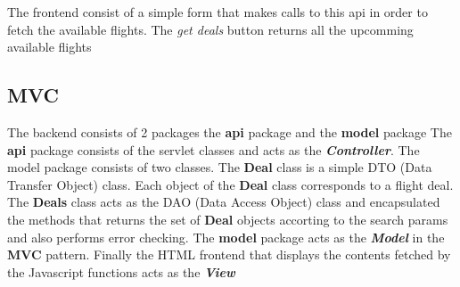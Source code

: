 \documentclass[titlepage]{article}
\begin{document}
    The frontend consist of a simple form that makes calls to this api in order to fetch the
    available flights. The \emph{get deals} button returns all the upcomming available flights

    \subsection{MVC}
    The backend consists of 2 packages the \textbf{api} package and the \textbf{model} package
    The \textbf{api} package consists of the servlet classes and acts as the \textit{\textbf{Controller}}.
    The model package consists of two classes. The \textbf{Deal} class is a simple DTO (Data Transfer Object) class.
    Each object of the \textbf{Deal} class corresponds to a flight deal. 
    The \textbf{Deals} class acts as the DAO (Data Access Object) class and encapsulated the methods
    that returns the set of \textbf{Deal} objects accorting to the search params and also performs error checking.
    The \textbf{model} package acts as the \textit{\textbf{Model}} in the \textbf{MVC} pattern.
    Finally the HTML frontend that displays the contents fetched by the Javascript functions acts as the \textit{\textbf{View}}
\end{document}

